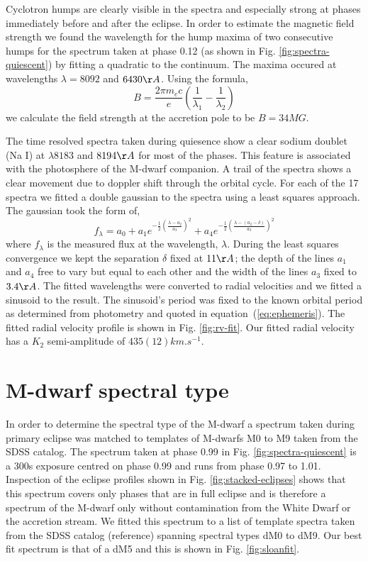 \documentclass[a4paper,fleqn,usenatbib]{mnras}
\begin{document}
Cyclotron humps are clearly visible in the spectra and especially strong at phases immediately before and after the eclipse. In order to estimate the magnetic field strength we found the wavelength for the hump maxima of two consecutive humps for the spectrum taken at phase 0.12 (as shown in Fig. \ref{fig:spectra-quiescent}) by fitting a quadratic to the continuum. The maxima occured at wavelengths $\lambda  = 8092$ and $6430 \AA$. Using the formula, 
\begin{equation}B = \frac{2 \pi m_e c}{e}(\frac{1}{\lambda_1} - \frac{1}{\lambda_2})\end{equation}
we calculate the field strength at the accretion pole to be $B = 34MG$.

The time resolved spectra taken during quiesence show a clear sodium doublet (Na I) at $\lambda 8183$ and $8194 \AA$ for most of the phases. This feature is associated with the photosphere of the M-dwarf companion. A trail of the spectra shows a clear movement due to doppler shift through the orbital cycle. For each of the 17 spectra we fitted a double gaussian to the spectra using a least squares approach. The gaussian took the form of, 
\begin{equation}f_\lambda = a_0 + a_1 e^{-\frac{1}{2}(\frac{\lambda - a_2}{a_3})^2} + a_4 e^{-\frac{1}{2}(\frac{\lambda - (a_2 - \delta)}{a_3})^2}  \end{equation}
where $f_\lambda$ is the measured flux at the wavelength, $\lambda$. During the least squares convergence we kept the separation $\delta$ fixed at $11 \AA$; the depth of the lines $a_1$ and $a_4$ free to vary but equal to each other and the width of the lines $a_3$ fixed to $3.4 \AA$. The fitted wavelengths were converted to radial velocities and we fitted a sinusoid to the result. The sinusoid's period was fixed to the known orbital period as determined from photometry and quoted in equation~(\ref{eq:ephemeris}). The fitted radial velocity profile is shown in Fig. \ref{fig:rv-fit}. Our fitted radial velocity has a $K_2$ semi-amplitude of $435(12) km.s^{-1}$. 

\section{M-dwarf spectral type}
In order to determine the spectral type of the M-dwarf a spectrum taken during primary eclipse was matched to templates of M-dwarfs M0 to M9 taken from the SDSS catalog. The spectrum taken at phase 0.99 in Fig. \ref{fig:spectra-quiescent} is a 300s exposure centred on phase 0.99 and runs from phase 0.97 to 1.01. Inspection of the eclipse profiles shown in Fig. \ref{fig:stacked-eclipses} shows that this spectrum covers only phases that are in full eclipse and is therefore a spectrum of the M-dwarf only without contamination from the White Dwarf or the accretion stream. We fitted this spectrum to a list of template spectra taken from the SDSS catalog (reference) spanning spectral types dM0 to dM9. Our best fit spectrum is that of a dM5 and this is shown in Fig. \ref{fig:sloanfit}. 
\end{document}
